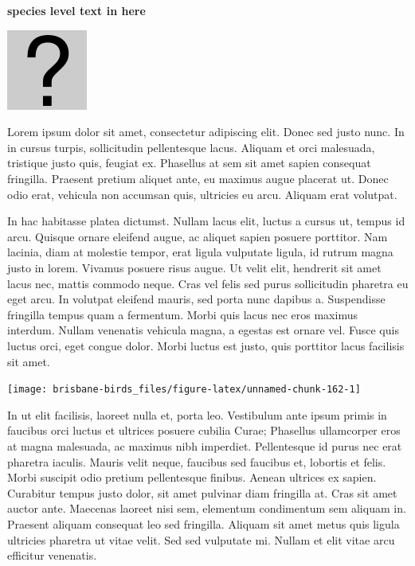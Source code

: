 \documentclass[]{book}
\let\origfigure\figure
\let\endorigfigure\endfigure
\renewenvironment{figure}[1][2] {
  \expandafter\origfigure\expandafter[H]
} {
  \endorigfigure
}
\begin{document}
\textbf{species level text in here}

\begin{figure}
\centering
\includegraphics{assets/missing.png}
\caption{No image for species}
\end{figure}

Lorem ipsum dolor sit amet, consectetur adipiscing elit. Donec sed justo
nunc. In in cursus turpis, sollicitudin pellentesque lacus. Aliquam et
orci malesuada, tristique justo quis, feugiat ex. Phasellus at sem sit
amet sapien consequat fringilla. Praesent pretium aliquet ante, eu
maximus augue placerat ut. Donec odio erat, vehicula non accumsan quis,
ultricies eu arcu. Aliquam erat volutpat.

In hac habitasse platea dictumst. Nullam lacus elit, luctus a cursus ut,
tempus id arcu. Quisque ornare eleifend augue, ac aliquet sapien posuere
porttitor. Nam lacinia, diam at molestie tempor, erat ligula vulputate
ligula, id rutrum magna justo in lorem. Vivamus posuere risus augue. Ut
velit elit, hendrerit sit amet lacus nec, mattis commodo neque. Cras vel
felis sed purus sollicitudin pharetra eu eget arcu. In volutpat eleifend
mauris, sed porta nunc dapibus a. Suspendisse fringilla tempus quam a
fermentum. Morbi quis lacus nec eros maximus interdum. Nullam venenatis
vehicula magna, a egestas est ornare vel. Fusce quis luctus orci, eget
congue dolor. Morbi luctus est justo, quis porttitor lacus facilisis sit
amet.

\begin{figure}
\texttt{[image: brisbane-birds\_files/figure-latex/unnamed-chunk-162-1]} \caption{insert figure caption}\label{fig:unnamed-chunk-162}
\end{figure}

In ut elit facilisis, laoreet nulla et, porta leo. Vestibulum ante ipsum
primis in faucibus orci luctus et ultrices posuere cubilia Curae;
Phasellus ullamcorper eros at magna malesuada, ac maximus nibh
imperdiet. Pellentesque id purus nec erat pharetra iaculis. Mauris velit
neque, faucibus sed faucibus et, lobortis et felis. Morbi suscipit odio
pretium pellentesque finibus. Aenean ultrices ex sapien. Curabitur
tempus justo dolor, sit amet pulvinar diam fringilla at. Cras sit amet
auctor ante. Maecenas laoreet nisi sem, elementum condimentum sem
aliquam in. Praesent aliquam consequat leo sed fringilla. Aliquam sit
amet metus quis ligula ultricies pharetra ut vitae velit. Sed sed
vulputate mi. Nullam et elit vitae arcu efficitur venenatis.
\end{document}
